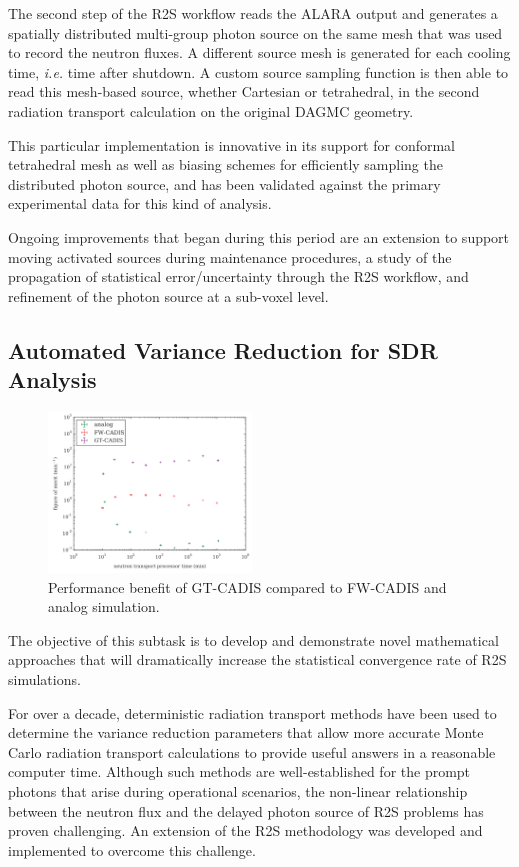 The second step of the \gls{R2S} workflow reads the ALARA output and generates
a spatially distributed multi-group photon source on the same mesh that was
used to record the neutron fluxes.  A different source mesh is generated for
each cooling time, \emph{i.e.} time after shutdown.  A custom source sampling
function is then able to read this mesh-based source, whether Cartesian or
tetrahedral, in the second radiation transport calculation on the original
\gls{DAGMC} geometry.

This particular implementation is innovative in its support for conformal
tetrahedral mesh as well as biasing schemes for efficiently sampling the
distributed photon source, and has been validated against the primary
experimental data for this kind of analysis.

Ongoing improvements that began during this period are an extension to support
moving activated sources during maintenance procedures, a study of the
propagation of statistical error/uncertainty through the \gls{R2S}
workflow, and refinement of the photon source at a
sub-voxel level.

\subsection{Automated Variance Reduction for \gls{SDR} Analysis}

\begin{figure}
\centering
\includegraphics[width=0.48\textwidth]{imgs/gt-cadis-timing.png}
\caption{\label{fig:gt-cadis-timing}Performance benefit of \gls{GT-CADIS}
  compared to \gls{FW-CADIS} and analog simulation.}
\end{figure}

The objective of this subtask is to develop and demonstrate novel mathematical
approaches that will dramatically increase the statistical convergence rate of
\gls{R2S} simulations.

For over a decade, deterministic radiation transport methods have been used to
determine the variance reduction parameters that allow more accurate Monte
Carlo radiation transport calculations to provide useful answers in a
reasonable computer time.  Although such methods are well-established for the
prompt photons that arise during operational scenarios, the non-linear
relationship between the neutron flux and the delayed photon source of
\gls{R2S} problems has proven challenging.  An extension of the \gls{R2S}
methodology was developed and implemented to overcome this challenge.

